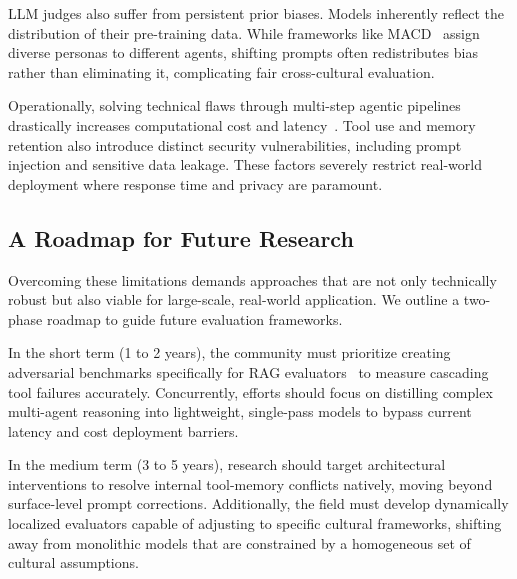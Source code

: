 LLM judges also suffer from persistent prior biases. Models inherently reflect the distribution of their pre-training data. While frameworks like MACD~\cite{macd} assign diverse personas to different agents, shifting prompts often redistributes bias rather than eliminating it, complicating fair cross-cultural evaluation.

Operationally, solving technical flaws through multi-step agentic pipelines drastically increases computational cost and latency~\cite{agent_survey}. Tool use and memory retention also introduce distinct security vulnerabilities, including prompt injection and sensitive data leakage. These factors severely restrict real-world deployment where response time and privacy are paramount.

\subsection{A Roadmap for Future Research}

Overcoming these limitations demands approaches that are not only technically robust but also viable for large-scale, real-world application. We outline a two-phase roadmap to guide future evaluation frameworks.

In the short term (1 to 2 years), the community must prioritize creating adversarial benchmarks specifically for RAG evaluators~\cite{Brehme_2025} to measure cascading tool failures accurately. Concurrently, efforts should focus on distilling complex multi-agent reasoning into lightweight, single-pass models to bypass current latency and cost deployment barriers.

In the medium term (3 to 5 years), research should target architectural interventions to resolve internal tool-memory conflicts natively, moving beyond surface-level prompt corrections. Additionally, the field must develop dynamically localized evaluators capable of adjusting to specific cultural frameworks, shifting away from monolithic models that are constrained by a homogeneous set of cultural assumptions.